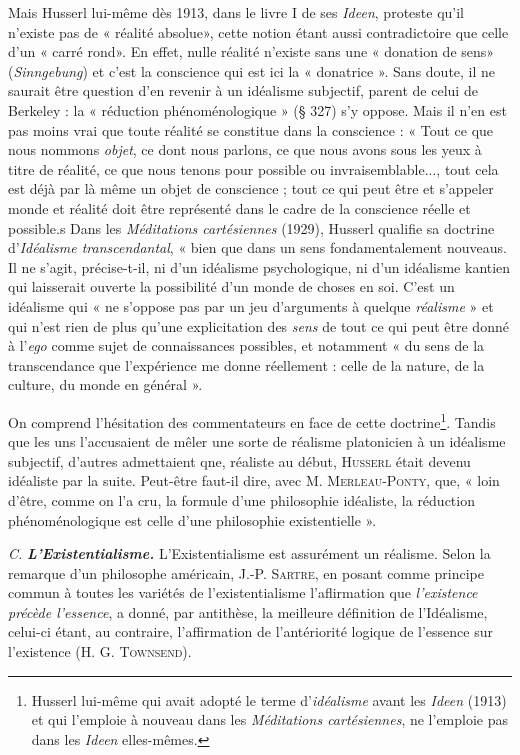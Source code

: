 Mais Husserl lui-même dès 1913, dans le livre I de ses {\it Ideen}, proteste qu'il
n'existe pas de « réalité absolue», cette notion étant aussi contradictoire
que celle d’un « carré rond». En effet, nulle réalité n'existe sans une « donation
de sens» ({\it Sinngebung}) et c’est la conscience qui est ici la « donatrice ».
Sans doute, il ne saurait être question d’en revenir à un idéalisme subjectif,
parent de celui de Berkeley : la « réduction phénoménologique » (§ 327) s’y
oppose. Mais il n’en est pas moins vrai que toute réalité se constitue dans
la conscience : « Tout ce que nous nommons {\it objet}, ce dont nous parlons,
ce que nous avons sous les yeux à titre de réalité, ce que nous tenons pour
possible ou invraisemblable..., tout cela est déjà par là même un objet de
conscience ; tout ce qui peut être et s'appeler monde et réalité doit être
représenté dans le cadre de la conscience réelle et possible.s Dans les
{\it Méditations cartésiennes} (1929), Husserl qualifie sa doctrine d’\textsf{\textit {Idéalisme
transcendantal}}, « bien que dans un sens fondamentalement nouveaus. Il ne s’agit,
précise-t-il, ni d’un idéalisme psychologique, ni d’un idéalisme kantien
qui laisserait ouverte la possibilité d'un monde de choses en soi. C’est un
idéalisme qui « ne s'oppose pas par un jeu d'arguments à quelque {\it réalisme} »
et qui n’est rien de plus qu’une explicitation des \textsf{\textit {sens}} de tout ce qui peut
être donné à l’{\it ego} comme sujet de connaissances possibles, et notamment
« du sens de la transcendance que l'expérience me donne réellement : celle
de la nature, de la culture, du monde en général ».

On comprend l’hésitation des commentateurs en face de cette
doctrine\footnote{Husserl lui-même qui avait adopté le terme d'{\it idéalisme} avant les {\it Ideen} (1913)
et qui l'emploie à nouveau dans les {\it Méditations cartésiennes}, ne l'emploie pas dans les
{\it Ideen} elles-mêmes.}. Tandis que les uns l’accusaient de mêler une sorte de
réalisme platonicien à un idéalisme subjectif, d’autres admettaient
qne, réaliste au début, \textsc{Husserl} était devenu idéaliste par la suite.
Peut-être faut-il dire, avec M. \textsc{Merleau-Ponty}, que, « loin d’être,
comme on l’a cru, la formule d’une philosophie idéaliste, la réduction
phénoménologique est celle d’une philosophie existentielle ».

{\it C.} \textbf{\textit {L’Existentialisme.}} L’Existentialisme est assurément un réalisme.
Selon la remarque d’un philosophe américain, J.-P. \textsc{Sartre},
en posant comme principe commun à toutes les variétés de l’existentialisme
l’aflirmation que {\it l'existence précède l'essence}, a donné, par
antithèse, la meilleure définition de l’Idéalisme, celui-ci étant, au
contraire, l’affirmation de l’antériorité logique de l’essence sur l’existence
(H. G. \textsc{Townsend}).

